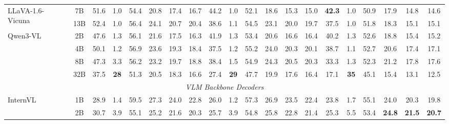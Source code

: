 \begin{table}[t]
{\begin{tabular}{lc|cccccc|cccccc|cccccc}
\multirow{2}{*}{LLaVA-1.6-Vicuna} & 7B & 51.6 & 1.0 & 54.4 & 20.8 & 17.4 & 16.7 & 44.2 & 1.0 & 52.1 & 18.6 & 15.3 & 15.0 & \textbf{42.3} & 1.0 & 50.9 & 17.9 & 14.8 & 14.6 \\
 & 13B & 52.4 & 1.0 & \cellcolor{gray!15}56.4 & \cellcolor{gray!15}24.1 & \cellcolor{gray!15}20.7 & \cellcolor{gray!15}20.4 & 38.6 & 1.1 & \cellcolor{gray!15}54.5 & \cellcolor{gray!15}23.1 & \cellcolor{gray!15}20.0 & \cellcolor{gray!15}19.7 & 37.5 & 1.0 & 51.8 & 18.3 & 15.1 & 15.1 \\
\multirow{4}{*}{Qwen3-VL} & 2B & 47.6 & 1.3 & \cellcolor{gray!15}56.1 & 21.6 & 17.5 & 16.3 & 41.9 & 1.3 & \cellcolor{gray!15}53.4 & 20.6 & 16.6 & 16.4 & 40.2 & 1.3 & \cellcolor{gray!15}52.6 & 18.8 & 15.4 & 15.2 \\
 & 4B & 50.1 & 1.2 & \cellcolor{gray!15}56.9 & \cellcolor{gray!15}23.6 & \cellcolor{gray!15}19.3 & \cellcolor{gray!15}18.4 & 37.5 & 1.2 & \cellcolor{gray!15}55.2 & \cellcolor{gray!15}24.0 & \cellcolor{gray!15}20.3 & \cellcolor{gray!15}20.1 & 38.7 & 1.1 & \cellcolor{gray!15}52.7 & \cellcolor{gray!15}20.6 & \cellcolor{gray!15}17.4 & \cellcolor{gray!15}17.1 \\
 & 8B & 47.3 & 3.3 & \cellcolor{gray!15}56.2 & \cellcolor{gray!15}23.2 & \cellcolor{gray!15}19.7 & \cellcolor{gray!15}18.8 & 38.4 & 1.5 & \cellcolor{gray!15}54.9 & \cellcolor{gray!15}24.3 & \cellcolor{gray!15}20.5 & \cellcolor{gray!15}20.3 & 33.3 & 1.3 & 52.3 & \cellcolor{gray!15}21.2 & \cellcolor{gray!15}17.8 & \cellcolor{gray!15}17.6 \\
 & 32B & 37.5 & \textbf{28} & 51.3 & 20.5 & 18.3 & 16.6 & \cellcolor{gray!15}27.4 & \textbf{29} & 47.7 & 19.9 & 17.6 & 16.4 & \cellcolor{gray!15}17.1 & \textbf{35} & 45.1 & 15.4 & 13.1 & 12.5 \\
\midrule
\multicolumn{20}{c}{\textit{VLM Backbone Decoders}} \\
\midrule
\multirow{3}{*}{InternVL} & 1B & \cellcolor{gray!15}28.9 & 1.4 & \cellcolor{gray!15}59.5 & \cellcolor{gray!15}27.3 & \cellcolor{gray!15}24.0 & \cellcolor{gray!15}22.8 & \cellcolor{gray!15}26.0 & 1.2 & \cellcolor{gray!15}57.3 & \cellcolor{gray!15}26.9 & \cellcolor{gray!15}23.5 & \cellcolor{gray!15}22.4 & \cellcolor{gray!15}23.8 & 1.7 & \cellcolor{gray!15}55.1 & \cellcolor{gray!15}24.0 & \cellcolor{gray!15}20.3 & \cellcolor{gray!15}19.8 \\
 & 2B & \cellcolor{gray!15}30.7 & 3.9 & \cellcolor{gray!15}55.1 & \cellcolor{gray!15}25.2 & \cellcolor{gray!15}21.6 & \cellcolor{gray!15}20.3 & \cellcolor{gray!15}25.7 & 3.9 & \cellcolor{gray!15}54.8 & \cellcolor{gray!15}25.8 & \cellcolor{gray!15}22.8 & \cellcolor{gray!15}21.4 & \cellcolor{gray!15}25.3 & 5.5 & \cellcolor{gray!15}53.4 & \cellcolor{gray!15}\textbf{24.8} & \cellcolor{gray!15}\textbf{21.5} & \cellcolor{gray!15}\textbf{20.7} \\

\end{tabular}}
\end{table}
